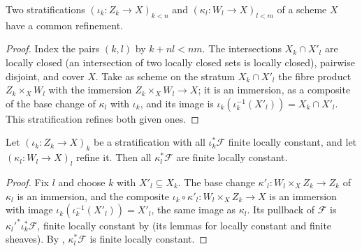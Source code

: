 \begin{lemma}\label{lemma:constructible-common-refinement}
\leanok
Two stratifications $(\iota_k\colon Z_k\to X)_{k<n}$ and
$(\kappa_l\colon W_l\to X)_{l<m}$ of a scheme $X$ have a common refinement.
\end{lemma}
\begin{proof}
\leanok
Index the pairs $(k,l)$ by $k+nl<nm$.  The intersections $X_k\cap X'_l$ are
locally closed (an intersection of two locally closed sets is locally
closed), pairwise disjoint, and cover $X$.  Take as scheme on the stratum
$X_k\cap X'_l$ the fibre product $Z_k\times_XW_l$ with the immersion
$Z_k\times_XW_l\to X$; it is an immersion, as a composite of the base
change of $\kappa_l$ with $\iota_k$, and its image is
$\iota_k(\iota_k^{-1}(X'_l))=X_k\cap X'_l$.  This stratification refines
both given ones.
\end{proof}

\begin{lemma}
\label{lemma:constructible-of-refines}
\leanok
Let $(\iota_k\colon Z_k\to X)_k$ be a stratification with all
$\iota_k^*\mathcal F$ finite locally constant, and let
$(\kappa_l\colon W_l\to X)_l$ refine it.  Then all $\kappa_l^*\mathcal F$
are finite locally constant.
\end{lemma}
\begin{proof}
\leanok
Fix $l$ and choose $k$ with $X'_l\subseteq X_k$.  The base change
$\kappa'_l\colon W_l\times_XZ_k\to Z_k$ of $\kappa_l$ is an immersion, and
the composite $\iota_k\circ\kappa'_l\colon W_l\times_XZ_k\to X$ is an
immersion with image $\iota_k(\iota_k^{-1}(X'_l))=X'_l$, the same image as
$\kappa_l$.  Its pullback of $\mathcal F$ is
$\kappa_l'^*\iota_k^*\mathcal F$, finite locally constant by
 (its lemmas for locally constant and
finite sheaves).  By ,
$\kappa_l^*\mathcal F$ is finite locally constant.
\end{proof}

